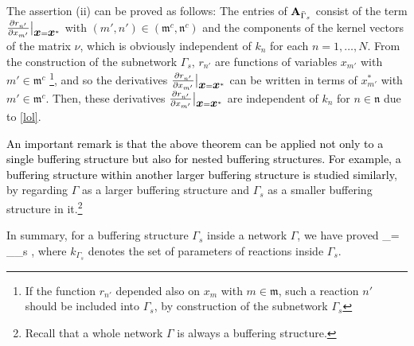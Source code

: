 \documentclass[ amsmath,amssymb,nofootinbib
]{revtex4-1}
\def\bal#1\eal{\begin{align}#1\end{align}}
\def\mbf#1{\mbox{\boldmath $#1$}}
\newcommand{\bx}{{\mbf x}}
\newcommand{\p}{\partial}
\newcommand{\corr}[1]{\textcolor{black}{#1}}
\begin{document}
The assertion (ii) can be proved as follows:
The entries of ${\bf A}_{\bar \Gamma_s}$ consist of the term $\frac{\p  r_{n'}}{\p x_{m'}}\big|_{\bx=\bx^*}$ with $(m',n') \in (\mathfrak m^c,\mathfrak n^c)$ and the components of the kernel vectors of the matrix $\nu$,
which is obviously independent of $k_n$ for each $n=1,\ldots,N$. 
From the construction of the subnetwork $\Gamma_s$, $r_{n'}$ are functions of variables $x_{m'}$ with $m'\in \mathfrak m^c$ \footnote{If the function $r_{n'}$ depended also on $x_m$ with $m\in \mathfrak m$, such a reaction $n'$ should be included into $\Gamma_s$, by construction of the subnetwork $\Gamma_s$}, and so  the derivatives $\frac{\p r_{n'}}{\p x_{m'}}\big|_{\bx=\bx^*}$ can be written in terms of  $x_{m'}^*$ with $m'\in \mathfrak m^c$. Then, these derivatives $\frac{\p r_{n'}}{\p x_{m'}}\big|_{\bx=\bx^*}$ are independent of $k_n$ for $n \in \mathfrak n$ due to \eqref{lol}.





\corr{An important remark is that the above theorem can  be applied not only to a single buffering structure  but also for nested buffering structures. For example, a buffering structure  within another larger buffering structure is studied similarly}, by regarding $\Gamma$  as a larger buffering structure and $\Gamma_s$ as a smaller buffering structure in it.\footnote{Recall that a whole network $\Gamma$ is always a buffering structure.}


In summary, for  a buffering structure $\Gamma_s$ inside  a network $\Gamma$, we have proved
\bal
\det {\bf A}_\Gamma = _{\Gamma_s}  \times {},\label{factorize'}
\eal
where $k_{\Gamma_s}$ denotes the set of parameters of reactions inside $\Gamma_s$. %
\end{document}
